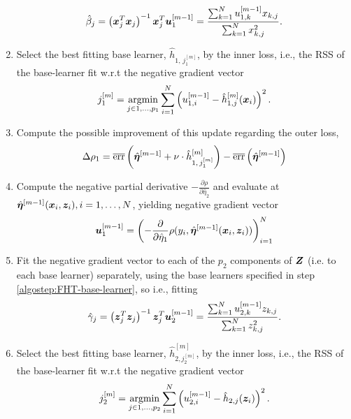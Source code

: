 \begin{algorithm}
\begin{enumerate}
        \begin{equation*}
            \hat{\beta}_j=\left(\bm{x}_j^T\bm{x}_j\right)^{-1}\bm{x}_j^T \bm{u}^{[m-1]}_1=\frac{\sum_{k=1}^N u^{[m-1]}_{1,k}x_{k,j}}{\sum_{k=1}^N x_{k,j}^2}.
        \end{equation*}
    \item
        Select the best fitting base learner, $\hat{h}_{1,\,j_1^{[m]}}$, by the inner loss,
        i.e., the RSS of the base-learner fit w.r.t the negative gradient vector
        \begin{equation*}
            j_1^{[m]}=\operatorname*{argmin}_{j\in 1,\ldots,p_1}\sum_{i=1}^N\left(u_{1,i}^{[m-1]}-\hat{h}^{[m]}_{1,j}(\bm{x}_i)\right)^2.
        \end{equation*}
    \item
        Compute the possible improvement of this update regarding the outer loss,
        \begin{equation*}
            \Delta\rho_1=\overline{\text{err}}\left(\hat{\boldsymbol{\eta}}^{[m-1]} + \nu \cdot \hat{h}^{[m]}_{1,\,j_1^{[m]}} \right)-\overline{\text{err}}\left(\hat{\boldsymbol{\eta}}^{[m-1]} \right)
        \end{equation*}
    \item
        Compute the negative partial derivative $-\frac{\partial\rho}{\partial \hat{\eta}_2}$
        and evaluate at $\hat{\boldsymbol{\eta}}^{[m-1]}(\bm{x}_i,\bm{z}_i),i=1,\ldots,N$, yielding negative gradient vector
        \begin{equation*}
            \bm{u}^{[m-1]}_1=\left(-\frac{\partial}{\partial \hat{\eta}_1}\rho(y_i, \hat{\boldsymbol{\eta}}^{[m-1]}(\bm{x}_i,\bm{z}_i))\right)_{i=1}^N
        \end{equation*}
    \item
        Fit the negative gradient vector to each of the $p_2$ components of $\bm{Z}$ (i.e. to each base learner) separately, using the base learners specified in step \ref{algostep:FHT-base-learner}, so i.e., fitting
        \begin{equation*}
            \hat{\gamma}_j=\left(\bm{z}_j^T\bm{z}_j\right)^{-1}\bm{z}_j^T \bm{u}^{[m-1]}_2=\frac{\sum_{k=1}^N u^{[m-1]}_{2,k}z_{k,j}}{\sum_{k=1}^N z_{k,j}^2}.
        \end{equation*}
    \item
        Select the best fitting base learner, $\hat{h}^{[m]}_{2,j_2^{[m]}}$, by the inner loss,
        i.e., the RSS of the base-learner fit w.r.t the negative gradient vector
        \begin{equation*}
            j_2^{[m]}=\argmin_{j\in 1,\ldots,p_2}\sum_{i=1}^N\left(u_{2,i}^{[m-1]}-\hat{h}_{2,j}(\z_i)\right)^2.

\end{equation*}
\end{enumerate}
\end{algorithm}
